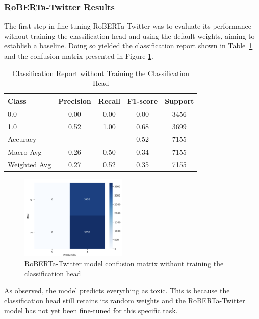 \subsubsection{RoBERTa-Twitter Results}

The first step in fine-tuning RoBERTa-Twitter was to evaluate its performance without training the classification head and using the default weights, aiming to establish a baseline. Doing so yielded the classification report shown in Table~\ref{tab:classification_report_1} and the confusion matrix presented in Figure \ref{fig:confusion_matrix_roberta_shapeY_no_head}.

\begin{table}[H]
\centering
\caption{Classification Report without Training the Classification Head}
\label{tab:classification_report_1}
\begin{tabular}{lcccc}
\toprule
Class        & Precision & Recall & F1-score & Support \\
\midrule
0.0          & 0.00      & 0.00   & 0.00     & 3456    \\
1.0          & 0.52      & 1.00   & 0.68     & 3699    \\
\midrule
Accuracy     &           &        & 0.52     & 7155    \\
Macro Avg    & 0.26      & 0.50   & 0.34     & 7155    \\
Weighted Avg & 0.27      & 0.52   & 0.35     & 7155    \\
\bottomrule
\end{tabular}
\end{table}

\begin{figure}[H]
    \centering
    \includegraphics[width=0.45\textwidth]{images/confusion_matrix_bilstm_shapeY.png}
    \caption{RoBERTa-Twitter model confusion matrix without training the classification head}
    \label{fig:confusion_matrix_roberta_shapeY_no_head}
\end{figure}


As observed, the model predicts everything as toxic. This is because the classification head still retains its random weights and the RoBERTa-Twitter model has not yet been fine-tuned for this specific task.

